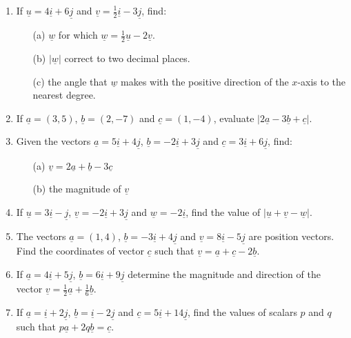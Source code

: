 \begin{enumerate}
	\item If $\underline{u} = 4\underline{i} + 6\underline{j}$ and $\underline{v} = \frac{1}{2}\underline{i} - 3\underline{j}$, find:
		\begin{itemize}
		\item[(a)] $\underline{w}$ for which $\underline{w} = \frac{1}{2}\underline{u} - 2\underline{v}$.
		\item[(b)] $|\underline{w}|$ correct to two decimal places.
		\item[(c)] the angle that $\underline{w}$ makes with the positive direction of the $x$-axis to the nearest degree.
		\end{itemize}

	\item If $\underline{a} = (3,5)$, $\underline{b} = (2,-7)$ and $\underline{c} = (1,-4)$, evaluate $|2\underline{a} - 3\underline{b} + \underline{c}|$.
	
	\item Given the vectors $\underline{a} = 5\underline{i} + 4\underline{j}$, $\underline{b} = -2\underline{i} + 3\underline{j}$ and $\underline{c} = 3\underline{i} + 6\underline{j}$, find:
		\begin{itemize}
		\item[(a)] $\underline{v} = 2\underline{a} + \underline{b} - 3\underline{c}$
		\item[(b)] the magnitude of $\underline{v}$
		\end{itemize}
		
	\item If $\underline{u} = 3\underline{i} - \underline{j}$, $\underline{v} = -2\underline{i} + 3\underline{j}$ and $\underline{w} = -2\underline{i}$, find the value of $|\underline{u} + \underline{v} - \underline{w}|$.
	
	\item The vectors $\underline{a} = (1,4)$, $\underline{b} = -3\underline{i} + 4\underline{j}$ and $\underline{v} = 8\underline{i} - 5\underline{j}$ are position vectors. Find the coordinates of vector $\underline{c}$ such that $\underline{v} = \underline{a} + \underline{c} - 2\underline{b}$.
	
	\item If $\underline{a} = 4\underline{i} + 5\underline{j}$, $\underline{b} = 6\underline{i} + 9\underline{j}$ determine the magnitude and direction of the vector $\underline{v} = \frac{1}{2}\underline{a} + \frac{1}{6}\underline{b}$.
	
	\item If $\underline{a} = \underline{i} + 2\underline{j}$, $\underline{b} = \underline{i} - 2\underline{j}$ and $\underline{c} = 5\underline{i} + 14\underline{j}$, find the values of scalars $p$ and $q$ such that $p\underline{a} + 2q\underline{b} = \underline{c}$.
	

\end{enumerate}
